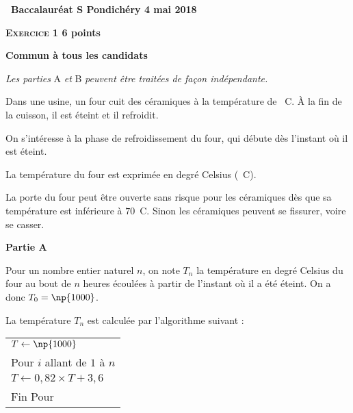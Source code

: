 \documentclass[10pt]{article}
\begin{document}
\setlength\parindent{0mm}
\pagestyle{fancy}
\thispagestyle{empty}

\begin{center}{\Large\textbf{\decofourleft~Baccalauréat S Pondichéry 4 mai 2018~\decofourright}}
\end{center}

\vspace{0,25cm}

\textbf{\textsc{Exercice 1} \hfill 6 points}
 
\textbf{Commun  à tous les candidats}

\medskip

\emph{Les parties } A \emph{et}   B \emph{peuvent être traitées de façon indépendante.}

\bigskip


Dans une usine, un four cuit des céramiques à la température de ~\degres C. À la fin de la
cuisson, il est éteint et il refroidit.

\smallskip

On s'intéresse à la phase de refroidissement du four, qui débute dès l'instant où il est éteint.

\smallskip
La température du four est exprimée en degré Celsius (\degres~C).

\smallskip

La porte du four peut être ouverte sans risque pour les céramiques dès que sa température est
inférieure à $70$\degres~C. Sinon les céramiques peuvent se fissurer, voire se casser.

\bigskip

\textbf{Partie A}

\medskip

Pour un nombre entier naturel $n$, on note $T_n$ la température en degré Celsius du four au bout
de $n$ heures écoulées à partir de l'instant où il a été éteint. On a donc $T_0 = \np{1000}$.

La température $T_n$ est calculée par l'algorithme suivant :

\begin{center}
\begin{tabularx}{0.35\linewidth}{|X|}\hline
$T \gets \np{1000}$\\
Pour $i$ allant de $1$ à $n$\\
\hspace{1cm}$T \gets 0,82 \times T + 3,6$\\
Fin Pour\\\hline
\end{tabularx}
\end{center}
\end{document}

